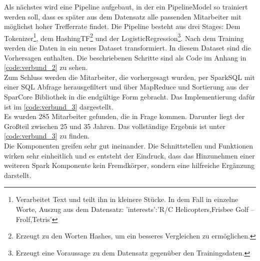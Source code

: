 \noindent
Als nächstes wird eine Pipeline aufgebaut, in der ein PipelineModel so trainiert werden soll, dass es später aus dem Datensatz alle passenden Mitarbeiter mit möglichst hoher Trefferrate findet. Die Pipeline besteht aus drei Stages: Dem Tokenizer\footnote{Verarbeitet Text und teilt ihn in kleinere Stücke. In dem Fall in einzelne Worte, Auszug aus dem Datensatz: 'interests':'R/C Helicopters,Frisbee Golf – Frolf,Tetris'}, dem HashingTF\footnote{Erzeugt zu den Worten Hashes, um ein besseres Vergleichen zu ermöglichen.} und der LogisticRegression\footnote{Erzeugt eine Voraussage zu dem Datensatz gegenüber den Trainingsdaten.}. Nach dem Training werden die Daten in ein neues Dataset transformiert. In diesem Dataset sind die Vorhersagen enthalten. Die beschriebenen Schritte sind als Code im Anhang in \autoref{code:verbund_2} zu sehen. \\

\noindent
Zum Schluss werden die Mitarbeiter, die vorhergesagt wurden, per SparkSQL mit einer SQL Abfrage herausgefiltert und über MapReduce und Sortierung aus der SparCore Bibliothek in die endgültige Form gebracht. Das Implementierung dafür ist im \autoref{code:verbund_3} dargestellt. \\

\noindent
Es wurden 285 Mitarbeiter gefunden, die in Frage kommen. Darunter liegt der Großteil zwischen 25 und 35 Jahren. Das vollständige Ergebnis ist unter \autoref{code:verbund_3} zu finden.\\

\noindent
Die Komponenten greifen sehr gut ineinander. Die Schnittstellen und Funktionen wirken sehr einheitlich und es entsteht der Eindruck, dass das Hinzunehmen einer weiteren Spark Komponente kein Fremdkörper, sondern eine hilfreiche Ergänzung darstellt.

 








